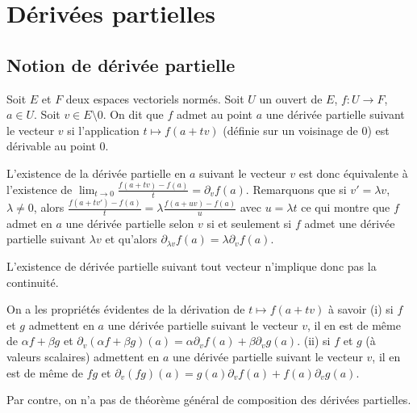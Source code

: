 \section{Dérivées partielles}

\subsection{Notion de dérivée partielle}

\begin{de}
Soit $E$ et $F$ deux espaces vectoriels normés. Soit $U$ un ouvert de $E$, $f:U\to F$, $a\in U$. Soit $v\in E\setminus{0}$. On dit que $f$ admet au point $a$ une dérivée partielle suivant le vecteur $v$ si l’application $t\mapsto f(a+tv)$ (définie sur un voisinage de 0) est dérivable au point 0.
\end{de}

\begin{rem}
L’existence de la dérivée partielle en $a$ suivant le vecteur $v$ est donc équivalente à l’existence de $\lim_{t\to 0}\frac{f(a+tv)-f(a)}{t}=\partial_v f(a)$. Remarquons que si $v'=\lambda v$, $\lambda\neq 0$, alors $\frac{f(a+tv')-f(a)}{t}=\lambda\frac{f(a+uv)-f(a)}{u}$ avec $u=\lambda t$ ce qui montre que $f$ admet en $a$ une dérivée partielle selon $v$ si et seulement si $f$ admet une dérivée partielle suivant $\lambda v$ et qu’alors $\partial_{\lambda v} f(a)=\lambda \partial_v f(a)$.
\end{rem}

\begin{rem}
L’existence de dérivée partielle suivant tout vecteur n’implique donc pas la continuité.
\end{rem}

\begin{prop}
On a les propriétés évidentes de la dérivation de $t\mapsto f(a+tv)$ à savoir (i) si $f$ et $g$ admettent en $a$ une dérivée partielle suivant le vecteur $v$, il en est de même de $\alpha f+\beta g$ et $\partial_v(\alpha f+\beta g)(a)=\alpha \partial_v f(a)+\beta \partial_v g(a)$. (ii) si $f$ et $g$ (à valeurs scalaires) admettent en $a$ une dérivée partielle suivant le vecteur $v$, il en est de même de $fg$ et $\partial_v(fg)(a)=g(a)\partial_v f(a)+f(a)\partial_v g(a)$.
\end{prop}

\begin{rem}
Par contre, on n’a pas de théorème général de composition des dérivées partielles.
\end{rem}


